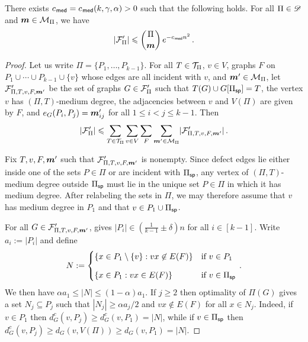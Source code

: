 \begin{lemma}\label{lemma:super-FPiprime}
There exists $c_{\hspace{0.2mm}\mathsf{med}}=c_{\hspace{0.2mm}\mathsf{med}}(k,\gamma,\alpha)>0$ such that the following holds. For all $\Pi\in{\mathscr D}$ and $\boldsymbol{m}\in{\mathcal M}_\Pi$, we have
$$\lvert{\mathcal F}'_\Pi\rvert \leqslant \binom{\Pi}{\boldsymbol{m}}\,e^{-c_{\hspace{0.2mm}\mathsf{med}} n^2}\,.$$
\end{lemma}
\begin{proof}
Let us write $\Pi=\{P_1,\dots,P_{k-1}\}$. For all $T\in{\mathcal T}_\Pi$, $v\in V$, graphs $F$ on $P_1\cup\cdots\cup P_{k-1}\cup\{v\}$ whose edges are all incident with $v$, and $\boldsymbol{m}'\in{\mathcal M}_\Pi$, let ${\mathcal F}'_{\Pi,T,v,F,\boldsymbol{m}'}$ be the set of graphs $G\in{\mathcal F}'_\Pi$ such that $T(G)\cup G[\Pi_{\mathsf{sp}}]=T$, the vertex $v$ has $(\Pi,T)$-medium degree, the adjacencies between $v$ and $V(\Pi)$ are given by $F$, and $e_G(P_i,P_j)=\boldsymbol{m}'_{ij}$ for all $1\leq i<j\leq k-1$.
Then
\begin{equation}\label{eqn:super-medium-cover-K1k}
\lvert{\mathcal F}'_\Pi\rvert\leqslant \sum_{T\in{\mathcal T}_\Pi}\sum_{v\in V}\sum_F\sum_{\boldsymbol{m}'\in{\mathcal M}_\Pi}\lvert{\mathcal F}'_{\Pi,T,v,F,\boldsymbol{m}'}\rvert\,.
\end{equation}

Fix $T,v,F,\boldsymbol{m}'$ such that ${\mathcal F}'_{\Pi,T,v,F,\boldsymbol{m}'}$ is nonempty. Since defect edges lie either inside one of the sets $P\in\Pi$ or are incident with $\Pi_{\mathsf{sp}}$, any vertex of $(\Pi,T)$-medium degree outside $\Pi_{\mathsf{sp}}$ must lie in the unique set $P\in\Pi$ in which it has medium degree. After relabeling the sets in $\Pi$, we may therefore assume that $v$ has medium degree in $P_1$ and that $v\in P_1\cup\Pi_{\mathsf{sp}}$.

For all $G\in{\mathcal F}'_{\Pi,T,v,F,\boldsymbol{m}'}$,  gives $|P_i|\in(\frac{1}{k-1}\pm\delta)n$ for all $i\in[k-1]$. Write $a_i:=|P_i|$ and define
$$N:=\begin{cases}\{x\in P_1\setminus\{v\}:vx\not\in E(F)\}&\text{if }v\in P_1\\[8pt]\{x\in P_1:vx\in E(F)\}&\text{if }v\in \Pi_{\mathsf{sp}}
\end{cases}\,.$$
We then have $\alpha a_1\leq |N|\leq (1-\alpha)a_1$. If $j\geq2$ then optimality of $\Pi(G)$ gives a set $N_j\subseteq P_j$ such that $|N_j|\geq\alpha a_j/2$ and $vx\not\in E(F)$ for all $x\in N_j$. Indeed, if $v\in P_1$ then $d_G^c(v,P_j)\geq d_G^c(v,P_1)=|N|$, while if $v\in\Pi_{\mathsf{sp}}$ then $d_G^c(v,P_j)\geq d_G(v,V(\Pi))\geq d_G(v,P_1)=|N|$.


\end{proof}
